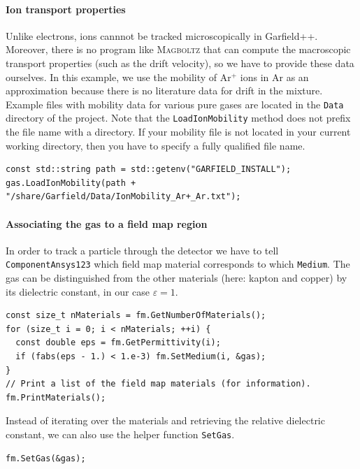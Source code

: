 \paragraph{Ion transport properties}
Unlike electrons, ions cannnot be tracked microscopically in Garfield++.
Moreover, there is no program like \textsc{Magboltz} that can compute  
the macroscopic transport properties (such as the drift velocity),
so we have to provide these data ourselves.
In this example, we use the mobility of Ar$^{+}$ ions in Ar
as an approximation because there is no literature data for drift in the
mixture.
Example files with mobility data for various pure gases are located
in the \texttt{Data} directory of the project.
Note that the \texttt{LoadIonMobility} method does not prefix
the file name with a directory.
If your mobility file is not located in your current working directory,
then you have to specify a fully qualified file name.
\begin{lstlisting}
const std::string path = std::getenv("GARFIELD_INSTALL");
gas.LoadIonMobility(path + "/share/Garfield/Data/IonMobility_Ar+_Ar.txt");
\end{lstlisting}
\paragraph{Associating the gas to a field map region}
In order to track a particle through the detector we have to 
tell \texttt{ComponentAnsys123} which field map material corresponds 
to which \texttt{Medium}.
The gas can be distinguished from the other materials
(here: kapton and copper) by its dielectric constant, in our case
$\varepsilon = 1$.
\begin{lstlisting}
const size_t nMaterials = fm.GetNumberOfMaterials();
for (size_t i = 0; i < nMaterials; ++i) {
  const double eps = fm.GetPermittivity(i);
  if (fabs(eps - 1.) < 1.e-3) fm.SetMedium(i, &gas);
}
// Print a list of the field map materials (for information).
fm.PrintMaterials();
\end{lstlisting}
Instead of iterating over the materials and retrieving the relative 
dielectric constant, we can also use the helper function \texttt{SetGas}.
\begin{lstlisting}
fm.SetGas(&gas);
\end{lstlisting}

